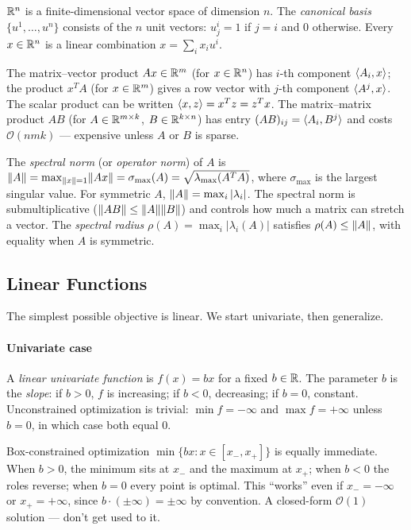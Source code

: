 $\mathbb{R}^n$ is a finite-dimensional vector space of dimension $n$.
The \textit{canonical basis} $\{u^1, \dots, u^n\}$ consists of the $n$ unit vectors: $u^i_j = 1$ if $j = i$ and $0$ otherwise.
Every $x \in \mathbb{R}^n$ is a linear combination $x = \sum_i x_i u^i$.

The matrix--vector product $Ax \in \mathbb{R}^m$ (for $x \in \mathbb{R}^n$) has $i$-th component $\langle A_i, x\rangle$; the product $x^T A$ (for $x \in \mathbb{R}^m$) gives a row vector with $j$-th component $\langle A^j, x\rangle$.
The scalar product can be written $\langle x, z\rangle = x^T z = z^T x$.
The matrix--matrix product $AB$ (for $A \in \mathbb{R}^{m \times k}$, $B \in \mathbb{R}^{k \times n}$) has entry $(AB)_{ij} = \langle A_i, B^j\rangle$ and costs $\mathcal{O}(nmk)$ --- expensive unless $A$ or $B$ is sparse.

The \textit{spectral norm} (or \textit{operator norm}) of $A$ is
$\lVert A\rVert = \max_{\lVert x\rVert=1} \lVert Ax\rVert = \sigma_{\max}(A) = \sqrt{\lambda_{\max}(A^T A)}$,
where $\sigma_{\max}$ is the largest singular value.
For symmetric $A$, $\lVert A\rVert = \max_i |\lambda_i|$.
The spectral norm is submultiplicative ($\lVert AB\rVert \leq \lVert A\rVert\lVert B\rVert$) and controls how much a matrix can stretch a vector.
The \textit{spectral radius} $\rho(A) = \max_i |\lambda_i(A)|$ satisfies $\rho(A) \leq \lVert A\rVert$, with equality when $A$ is symmetric.


\subsection{Linear Functions}\label{ssec:linear-functions}

The simplest possible objective is linear.
We start univariate, then generalize.

\paragraph{Univariate case}

A \textit{linear univariate function} is $f(x) = bx$ for a fixed $b \in \mathbb{R}$.
The parameter $b$ is the \textit{slope}: if $b > 0$, $f$ is increasing; if $b < 0$, decreasing; if $b = 0$, constant.
Unconstrained optimization is trivial: $\min f = -\infty$ and $\max f = +\infty$ unless $b = 0$, in which case both equal $0$.

Box-constrained optimization $\min\{bx : x \in [x_-, x_+]\}$ is equally immediate.
When $b > 0$, the minimum sits at $x_-$ and the maximum at $x_+$; when $b < 0$ the roles reverse; when $b = 0$ every point is optimal.
This ``works'' even if $x_- = -\infty$ or $x_+ = +\infty$, since $b \cdot (\pm \infty) = \pm \infty$ by convention.
A closed-form $\mathcal{O}(1)$ solution --- don't get used to it.

